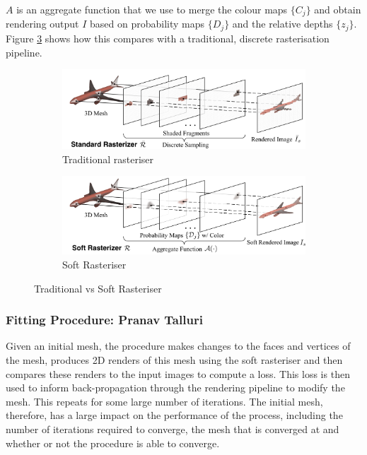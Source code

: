 \documentclass{article}
\begin{document}
$A$ is an aggregate function that we use to merge the colour maps $\{C_j\}$ and obtain rendering output $I$ based on probability maps $\{D_j\}$ and the relative depths $\{z_j\}$. Figure \ref{softrasraster} shows how this compares with a traditional, discrete rasterisation pipeline.

\begin{figure}[h!]
  \centering
  \begin{subfigure}{.49\textwidth}
    \includegraphics[width=\textwidth]{images/softras_b.png}
    \caption{Traditional rasteriser}
    \label{trad}
  \end{subfigure}
  \begin{subfigure}{.49\textwidth}
    \includegraphics[width=\textwidth]{images/softras_a.png}
    \caption{Soft Rasteriser}
    \label{soft}
  \end{subfigure}
  \caption{Traditional vs Soft Rasteriser \parencite{softras}}
  \label{softrasraster}
\end{figure}

\subsubsection{Fitting Procedure: Pranav Talluri}
\label{section:softrasalgo}
Given an initial mesh, the procedure makes changes to the faces and vertices of the mesh, produces 2D renders of this mesh using the soft rasteriser and then compares these renders to the input images to compute a loss. This loss is then used to inform back-propagation through the rendering pipeline to modify the mesh. This repeats for some large number of iterations. The initial mesh, therefore, has a large impact on the performance of the process, including the number of iterations required to converge, the mesh that is converged at and whether or not the procedure is able to converge.
\end{document}
